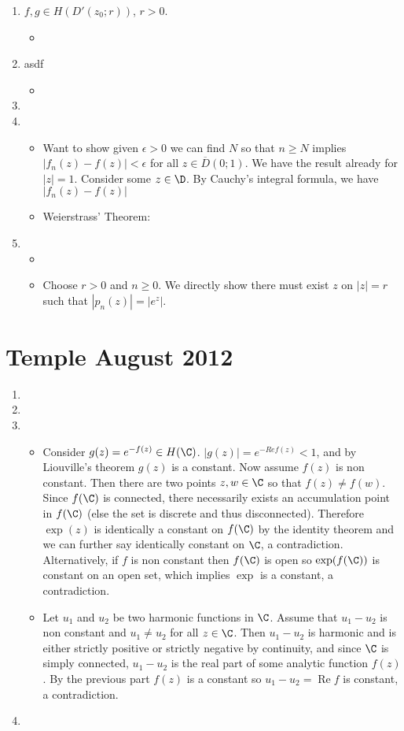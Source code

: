 \documentclass[11pt]{book}
\theoremstyle{definition}
\renewcommand{\Re}{\operatorname{Re}}
\begin{document}
\begin{enumerate}
\begin{itemize}
\end{itemize}
\item $f,g\in H(D'(z_0;r))$, $r>0$.
\begin{itemize}
\item
\end{itemize}
\item asdf
\begin{itemize}
\item
\end{itemize}
\item
\item
\begin{itemize}
\item Want to show given $\epsilon>0$ we can find $N$ so that $n\geq N$ implies $|f_n(z)-f(z)|<\epsilon$ for all $z\in \overline{D}(0;1)$. We have the result already for $|z|=1$. Consider some $z\in \D$. By Cauchy's integral formula, we have $|f_n(z)-f(z)|$
\item Weierstrass' Theorem:
\end{itemize}
\item
\begin{itemize}
\item
\item Choose $r>0$ and $n\geq 0$. We directly show there must exist $z$ on $|z|=r$ such that $|p_n(z)|=|e^z|$. 
\end{itemize}
\end{enumerate}
\section{Temple August 2012}
\begin{enumerate}
\item
\item
\item 
\begin{itemize}
\item Consider $g(z)=e^{-f(z)}\in H(\C)$. $|g(z)|=e^{-Re f(z)}<1$, and by Liouville's theorem $g(z)$ is a constant. Now assume $f(z)$ is non constant. Then there are two points $z,w\in \C$ so that $f(z)\neq f(w)$. Since $f(\C)$ is connected, there necessarily exists an accumulation point in $f(\C)$ (else the set is discrete and thus disconnected). Therefore $\exp(z)$ is identically a constant on $f(\C)$ by the identity theorem and we can further say identically constant on $\C$, a contradiction. Alternatively, if $f$ is non constant then $f(\C)$ is open so $\exp(f(\C))$ is constant on an open set, which implies $\exp$ is a constant, a contradiction. 
\item Let $u_1$ and $u_2$ be two harmonic functions in $\C$. Assume that $u_1-u_2$ is non constant and $u_1\neq u_2$ for all $z\in\C$. Then $u_1-u_2$ is harmonic and is either strictly positive or strictly negative by continuity, and since $\C$ is simply connected, $u_1-u_2$ is the real part of some analytic function $f(z)$. By the previous part $f(z)$ is a constant so $u_1-u_2=\Re f$ is constant, a contradiction.
\end{itemize}
\item
\end{enumerate}
\end{document}
